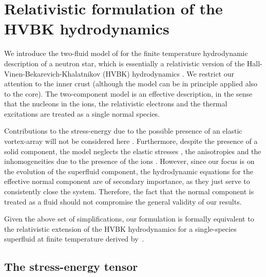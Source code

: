 \documentclass[preprints,article,accept,moreauthors,pdftex]{mdpi}
\begin{document}
\section{Relativistic  formulation of the HVBK hydrodynamics}
\label{sezione2}

We introduce the two-fluid model of \citet{langlois98} for the finite temperature hydrodynamic description of a neutron star, which is essentially a relativistic version of the Hall-Vinen-Bekarevich-Khalatnikov (HVBK) hydrodynamics \cite{GusakovHVBK}. We restrict our attention to the inner crust (although the model can be in principle applied also to the core).
The two-component model is an effective description, in the sense that the nucleons in the ions, the relativistic electrons and the thermal excitations are treated as a single normal species. 

Contributions to the stress-energy due to the possible presence of an elastic vortex-array will not be considered here \citep{baymChandler1983,Carter_KalbRamond1995,Andersson2020vortexElasticity}. 
Furthermore, despite the presence of a solid component, the model neglects the elastic stresses \citep{ander_elasticity_2019}, the  anisotropies and the  inhomogeneities due to the presence of the ions \citep{Carter2006IJMPD,Pethick2010PThPS,Kobyakov_pasta_2018}.  
However, since our focus is on the evolution of the superfluid component, the hydrodynamic equations for the effective normal component are of secondary importance, as they just serve to consistently close the system. Therefore, the fact that the normal component is treated as a fluid should not compromise the general validity of our results. 

Given the above set of simplifications, our formulation is formally equivalent to the relativistic extension of the HVBK hydrodynamics for a single-species superfluid at finite temperature derived by~\citet{GusakovHVBK}.

\subsection{The stress-energy tensor}
\end{document}
